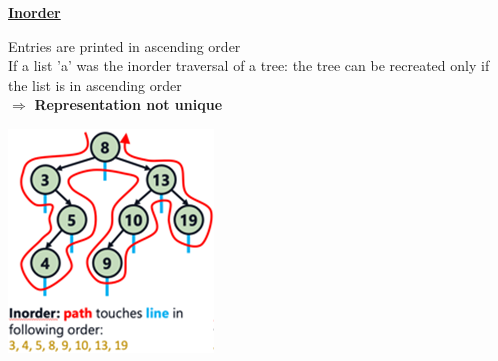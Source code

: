         {\centering\underline{\textbf{Inorder}} \par}
            \begin{minipage}{0.49\linewidth}
                
                Entries are printed in ascending order\\
                If a list 'a' was the inorder traversal of a tree: the tree can be recreated only if the list is in ascending order\\
                $\Rightarrow$ \textbf{Representation not unique}
            \end{minipage}
            \begin{minipage}{0.49\linewidth}
                {\centering \includegraphics[width = 0.85\linewidth]{src/4_data_structure/images/inorder.png} \par}
            \end{minipage}

